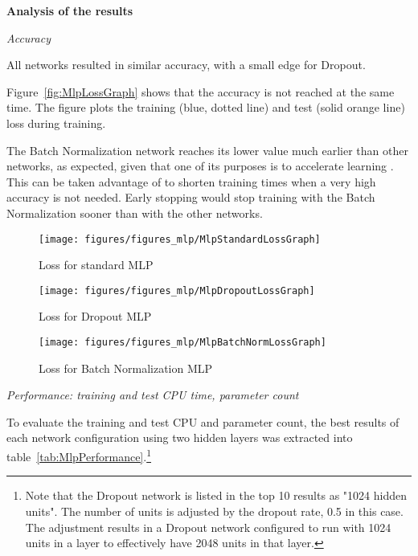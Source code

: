\documentclass[../CAP6619_term_project_cgarbin.tex]{subfiles}
\begin{document}
\medskip
\textbf{Analysis of the results}

\smallskip
\textit{Accuracy}

All networks resulted in similar accuracy, with a small edge for Dropout.

Figure~\ref{fig:MlpLossGraph} shows that the accuracy is not reached at the same time. The figure plots the training (blue, dotted line) and test (solid orange line) loss during training.

The Batch Normalization network reaches its lower value much earlier than other networks, as expected, given that one of its purposes is to accelerate learning \cite{Ioffe2015}. This can be taken advantage of to shorten training times when a very high accuracy is not needed. Early stopping would stop training with the Batch Normalization sooner than with the other networks.

\begin{figure*}
    \centering
    \begin{subfigure}{0.3\textwidth}
        \texttt{[image: figures/figures\_mlp/MlpStandardLossGraph]} 
        \caption{Loss for standard MLP} \label{fig:MlpStandardLossGraph}
    \end{subfigure}
    \hfill
    \begin{subfigure}{0.3\textwidth}
        \texttt{[image: figures/figures\_mlp/MlpDropoutLossGraph]} 
        \caption{Loss for Dropout MLP} \label{fig:MlpDropoutLossGraph}
    \end{subfigure}
    \begin{subfigure}{0.3\textwidth}
        \texttt{[image: figures/figures\_mlp/MlpBatchNormLossGraph]} 
        \caption{Loss for Batch Normalization MLP} \label{fig:MlpBatchNormLossGraph}
    \end{subfigure}
    \caption{Loss graphs for the top MLP network in each test}
    \label{fig:MlpLossGraph}
\end{figure*}


\smallskip
\textit{Performance: training and test CPU time, parameter count}

To evaluate the training and test CPU and parameter count, the best results of each network configuration using two hidden layers was extracted into table~\ref{tab:MlpPerformance}.\footnote{Note that the Dropout network is listed in the top 10 results as "1024 hidden units". The number of units is adjusted by the dropout rate, 0.5 in this case. The adjustment results in a Dropout network configured to run with 1024 units in a layer to effectively have 2048 units in that layer.}
\end{document}
